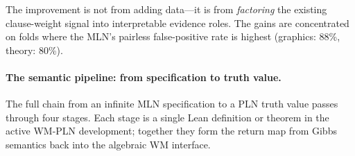\documentclass[11pt,openany]{report}
\begin{document}
\noindent
The improvement is not from adding data---it is from
\emph{factoring} the existing clause-weight signal into
interpretable evidence roles.  The gains are concentrated on
folds where the MLN's pairless false-positive rate is highest
(graphics: 88\%, theory: 80\%).


\paragraph{The semantic pipeline: from specification to truth value.}
The full chain from an infinite MLN specification to a PLN truth value
passes through four stages.  Each stage is a single Lean
definition or theorem in the active WM-PLN development; together they form the return map from Gibbs
semantics back into the algebraic WM interface.
\end{document}
